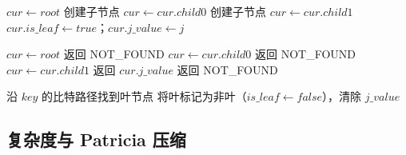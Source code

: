 \begin{algorithm}[htbp]
  \caption{Local Query Router.insert}
  \label{alg:lqr-insert}
  \begin{algorithmic}[1]
      \State $\mathit{cur}\gets\mathit{root}$
           创建子节点 \EndIf
          \State $\mathit{cur}\gets\mathit{cur.child0}$
        \Else
           创建子节点 \EndIf
          \State $\mathit{cur}\gets\mathit{cur.child1}$
        \EndIf
      \EndFor
      \State $\mathit{cur.is\_leaf}\gets\mathit{true}$；$\mathit{cur.j\_value}\gets j$
    \EndFunction
  \end{algorithmic}
\end{algorithm}

\begin{algorithm}[htbp]
  \caption{Local Query Router.query}
  \label{alg:lqr-query}
  \begin{algorithmic}[1]
      \State $\mathit{cur}\gets\mathit{root}$
           返回 NOT\_FOUND \EndIf
          \State $\mathit{cur}\gets\mathit{cur.child0}$
        \Else
           返回 NOT\_FOUND \EndIf
          \State $\mathit{cur}\gets\mathit{cur.child1}$
        \EndIf
      \EndFor
       返回 $\mathit{cur.j\_value}$
      \Else  返回 NOT\_FOUND
      \EndIf
    \EndFunction
  \end{algorithmic}
\end{algorithm}

\begin{algorithm}[htbp]
  \caption{Local Query Router.delete}
  \label{alg:lqr-delete}
  \begin{algorithmic}[1]
      \State 沿 $\mathit{key}$ 的比特路径找到叶节点
      \State 将叶标记为非叶（$\mathit{is\_leaf}\gets\mathit{false}$），清除 $\mathit{j\_value}$
    \EndFunction
  \end{algorithmic}
\end{algorithm}

\subsection{复杂度与 Patricia 压缩}

